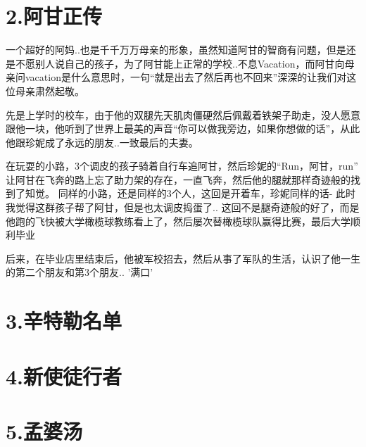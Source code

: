 \documentclass[UTF8,a4paper,8pt]{ctexbook}
\begin{document}
	\section*{2.阿甘正传}
		一个超好的阿妈..也是千千万万母亲的形象，虽然知道阿甘的智商有问题，但是还是不愿别人说自己的孩子，为了阿甘能上正常的学校..不息Vacation，而阿甘向母亲问vacation是什么意思时，一句“就是出去了然后再也不回来”深深的让我们对这位母亲肃然起敬。
		
		先是上学时的校车，由于他的双腿先天肌肉僵硬然后佩戴着铁架子助走，没人愿意跟他一块，他听到了世界上最美的声音“你可以做我旁边，如果你想做的话”，从此他跟珍妮成了永远的朋友..一致最后的夫妻。
		
		在玩耍的小路，3个调皮的孩子骑着自行车追阿甘，然后珍妮的“Run，阿甘，run” 让阿甘在飞奔的路上忘了助力架的存在，一直飞奔，然后他的腿就那样奇迹般的找到了知觉。
		同样的小路，还是同样的3个人，这回是开着车，珍妮同样的话- 此时我觉得这群孩子帮了阿甘，但是也太调皮捣蛋了.. 这回不是腿奇迹般的好了，而是他跑的飞快被大学橄榄球教练看上了，然后屡次替橄榄球队赢得比赛，最后大学顺利毕业
		
		后来，在毕业店里结束后，他被军校招去，然后从事了军队的生活，认识了他一生的第二个朋友和第3个朋友.. '满口'
		
	
	
	\section*{3.辛特勒名单}
	
	
	\section*{4.新使徒行者}


	\section*{5.孟婆汤}
		
\end{document}
